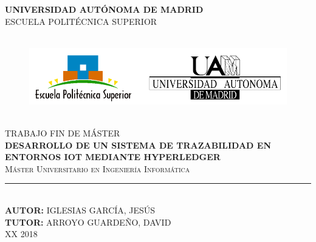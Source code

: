 \documentclass[12pt,a4paper, twoside]{report}
\newcommand{\university}{UNIVERSIDAD AUTÓNOMA DE MADRID}
\newcommand{\faculty}{ESCUELA POLITÉCNICA SUPERIOR}
\newcommand{\master}{Máster Universitario en Ingeniería Informática}
\newcommand{\tfm}{TRABAJO FIN DE MÁSTER}
\newcommand{\titleTFM}{DESARROLLO DE UN SISTEMA DE TRAZABILIDAD EN ENTORNOS IOT MEDIANTE HYPERLEDGER}
\newcommand{\jesus}{IGLESIAS GARCÍA, JESÚS}
\newcommand{\david}{ARROYO GUARDEÑO, DAVID}
\newcommand{\blankpage}{
				\newpage
				\thispagestyle{empty}
				\mbox{}
				\newpage
				}
\begin{document}
	
	\begin{titlepage}
		\begin{center}
			\vspace*{0.5in}	

			\Large{\textsc{\textbf{\university}}}\\	
			\vspace*{0.2in}
			\large{\textsc{\faculty}}\\
			\vspace*{0.5in}
			
			\begin{figure}[htb]
				\begin{center}
					\includegraphics[width=17cm, height=3.5cm]{Images/eps_uam}
				\end{center}
			\end{figure}
			\vspace*{0.6in}
			\Large{\textsc{\tfm}}\\
			\vspace*{0.35in}
			\Large{\textbf{\titleTFM}} \\
			\vspace*{0.8in}
			\large{\textsc{\master}}\\
			\vspace*{0.1in}
			\rule{100mm}{0.3mm}\\ %
			\vspace*{0.5in}
			\normalsize{\textbf{AUTOR:}} \normalsize{\jesus}  \\
			\vspace*{0.1in}
			\normalsize{\textbf{TUTOR:}} \normalsize{\david} \\
			\vspace*{0.4in}
			\large{{\color{red}XX} 2018} \\
		\end{center}
	\end{titlepage}
	
	\blankpage
	
\end{document}
